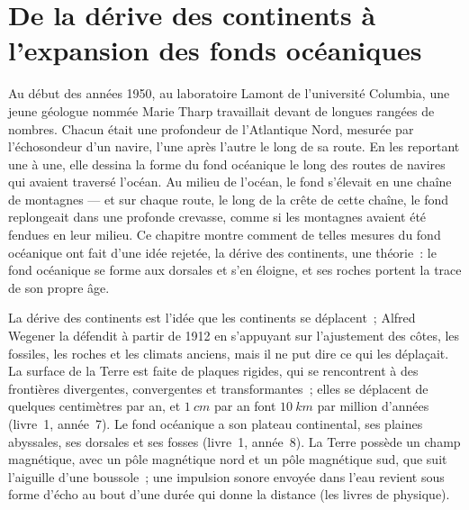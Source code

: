 \chapter{De la dérive des continents à l'expansion des fonds océaniques}\label{ch:g11:drift-to-spreading}

Au début des années 1950, au laboratoire Lamont de l'université Columbia,
une jeune géologue nommée Marie Tharp travaillait devant de longues rangées
de nombres. Chacun était une profondeur de l'Atlantique Nord, mesurée par
l'échosondeur d'un navire, l'une après l'autre le long de sa route. En les
reportant une à une, elle dessina la forme du fond océanique le long des
routes de navires qui avaient traversé l'océan. Au milieu de l'océan, le
fond s'élevait en une chaîne de montagnes --- et sur chaque route, le long
de la crête de cette chaîne, le fond replongeait dans une profonde
crevasse, comme si les montagnes avaient été fendues en leur milieu. Ce
chapitre montre comment de telles mesures du fond océanique ont fait d'une
idée rejetée, la dérive des continents, une théorie~: le fond océanique se
forme aux dorsales et s'en éloigne, et ses roches portent la trace de son
propre âge.

\begin{recall}
La dérive des continents est l'idée que les continents se déplacent~;
Alfred Wegener la défendit à partir de 1912 en s'appuyant sur l'ajustement
des côtes, les fossiles, les roches et les climats anciens, mais il ne put
dire ce qui les déplaçait. La surface de la Terre est faite de plaques
rigides, qui se rencontrent à des frontières divergentes, convergentes et
transformantes~; elles se déplacent de quelques centimètres par an, et
$\qty{1}{cm}$ par an font $\qty{10}{km}$
par million d'années (livre~1, année~7). Le fond océanique a son plateau
continental, ses plaines abyssales, ses dorsales et ses fosses (livre~1,
année~8). La Terre possède un champ magnétique, avec un pôle magnétique nord
et un pôle magnétique sud, que suit l'aiguille d'une boussole~; une
impulsion sonore envoyée dans l'eau revient sous forme d'écho au bout d'une
durée qui donne la distance (les livres de physique).
\end{recall}


